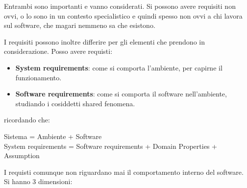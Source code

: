 Entrambi sono importanti e vanno considerati. Si possono avere requisiti non ovvi,
o lo sono in un contesto specialistico e quindi spesso non ovvi a chi lavora
sul software, che magari nemmeno sa che esistono.

I requisiti possono inoltre differire per gli elementi che prendono in considerazione.
Posso avere requisti:
\begin{itemize}
      \item \textbf{System requirements}: come si comporta l'ambiente, per capirne
            il funzionamento.
      \item \textbf{Software requirements}: come si comporta il software
            nell'ambiente, studiando i cosiddetti shared fenomena.
\end{itemize}
ricordando che:
\begin{center}
      Sistema = Ambiente + Software \\ System requirements = Software requirements
      + Domain Properties + Assumption
\end{center}
I requisti comunque non riguardano mai il comportamento interno del software.
\newline Si hanno 3 dimensioni:
